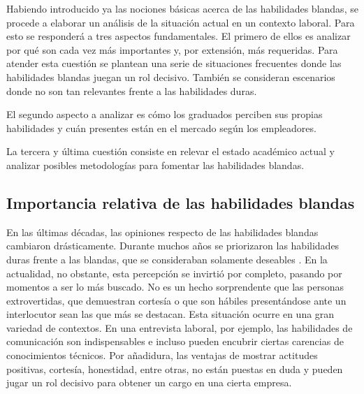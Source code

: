 \documentclass[conference]{IEEEtran}
\begin{document}
Habiendo introducido ya las nociones básicas acerca de las habilidades blandas, se procede a elaborar un análisis de la situación actual en un contexto laboral. Para esto se responderá a tres aspectos fundamentales. El primero de ellos es analizar por qué son cada vez más importantes y, por extensión, más requeridas. Para atender esta cuestión se plantean una serie de situaciones frecuentes donde las habilidades blandas juegan un rol decisivo. También se consideran escenarios donde no son tan relevantes frente a las habilidades duras.


El segundo aspecto a analizar es cómo los graduados perciben sus propias habilidades y cuán presentes están en el mercado según los empleadores.

La tercera y última cuestión consiste en relevar el estado académico actual y analizar posibles metodologías para fomentar las habilidades blandas.





\subsection{Importancia relativa de las habilidades blandas}
\label{scrivauto:12}

En las últimas décadas, las opiniones respecto de las habilidades blandas cambiaron drásticamente. Durante muchos años se priorizaron las habilidades duras frente a las blandas, que se consideraban solamente deseables \cite{b3}. En la actualidad, no obstante, esta percepción se invirtió por completo, pasando por momentos a ser lo más buscado. No es un hecho sorprendente que las personas extrovertidas, que demuestran cortesía o que son hábiles presentándose ante un interlocutor sean las que más se destacan. Esta situación ocurre en una gran variedad de contextos. En una entrevista laboral, por ejemplo, las habilidades de comunicación son indispensables e incluso pueden encubrir ciertas carencias de conocimientos técnicos. Por añadidura, las ventajas de mostrar actitudes positivas, cortesía, honestidad, entre otras, no están puestas en duda \cite{b3} y pueden jugar un rol decisivo para obtener un cargo en una cierta empresa.
\end{document}
